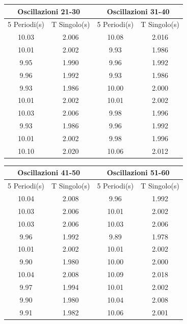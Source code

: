 \documentclass[a4paper]{article}
\begin{document}
\begin{center}
    \begin{tabular}{|c|c||c|c|}
    \hline
    \multicolumn{2}{|c||}{Oscillazioni 21-30} & \multicolumn{2}{|c|}{Oscillazioni 31-40} \\
    \hline
    5 Periodi(s) & T Singolo(s) & 5 Periodi(s) & T Singolo(s) \\
    \hline
      10.03 & 2.006 & 10.08 & 2.016 \\
      10.01 & 2.002 &  9.93 & 1.986\\
       9.95 & 1.990 &  9.96 & 1.992\\
       9.96 & 1.992 &  9.93 & 1.986 \\
       9.93 & 1.986 & 10.00 & 2.000\\
      10.01 & 2.002 & 10.01 & 2.002\\
      10.03 & 2.006 &  9.98 & 1.996\\ 
       9.93 & 1.986 &  9.96 & 1.992\\
      10.01 & 2.002 &  9.98 & 1.996\\
      10.10 & 2.020 & 10.06 & 2.012\\
    \hline
    \end{tabular}
\end{center}

\begin{center}
    \begin{tabular}{|c|c||c|c|}
    \hline
    \multicolumn{2}{|c||}{Oscillazioni 41-50} & \multicolumn{2}{|c|}{Oscillazioni 51-60} \\
    \hline
    5 Periodi(s) & T Singolo(s) & 5 Periodi(s) & T Singolo(s) \\
    \hline
      10.04 & 2.008 &  9.96 & 1.992 \\
      10.03 & 2.006 & 10.01 & 2.002 \\
      10.03 & 2.006 & 10.03 & 2.006 \\
       9.96 & 1.992 &  9.89 & 1.978 \\
      10.01 & 2.002 & 10.01 & 2.002 \\
       9.90 & 1.980 & 10.00 & 2.000 \\
      10.04 & 2.008 & 10.09 & 2.018 \\ 
       9.97 & 1.994 & 10.01 & 2.002 \\
       9.90 & 1.980 & 10.04 & 2.008 \\
       9.91 & 1.982 & 10.06 & 2.001 \\
    \hline
    \end{tabular}
\end{center}
\end{document}
